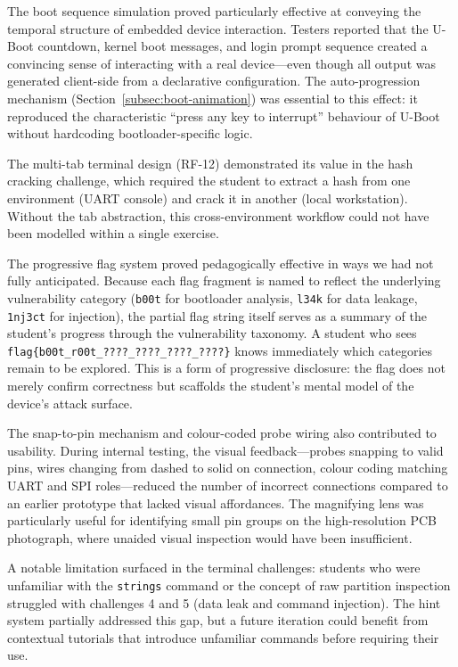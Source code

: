 The boot sequence simulation proved particularly effective at conveying the temporal structure of embedded device interaction. Testers reported that the U-Boot countdown, kernel boot messages, and login prompt sequence created a convincing sense of interacting with a real device---even though all output was generated client-side from a declarative configuration. The auto-progression mechanism (Section~\ref{subsec:boot-animation}) was essential to this effect: it reproduced the characteristic ``press any key to interrupt'' behaviour of U-Boot without hardcoding bootloader-specific logic.

The multi-tab terminal design (RF-12) demonstrated its value in the hash cracking challenge, which required the student to extract a hash from one environment (UART console) and crack it in another (local workstation). Without the tab abstraction, this cross-environment workflow could not have been modelled within a single exercise.

The progressive flag system proved pedagogically effective in ways we had not fully anticipated. Because each flag fragment is named to reflect the underlying vulnerability category (\texttt{b00t} for bootloader analysis, \texttt{l34k} for data leakage, \texttt{1nj3ct} for injection), the partial flag string itself serves as a summary of the student's progress through the vulnerability taxonomy. A student who sees \texttt{flag\{b00t\_r00t\_????\_????\_????\_????\}} knows immediately which categories remain to be explored. This is a form of progressive disclosure: the flag does not merely confirm correctness but scaffolds the student's mental model of the device's attack surface.

The snap-to-pin mechanism and colour-coded probe wiring also contributed to usability. During internal testing, the visual feedback---probes snapping to valid pins, wires changing from dashed to solid on connection, colour coding matching UART and SPI roles---reduced the number of incorrect connections compared to an earlier prototype that lacked visual affordances. The magnifying lens was particularly useful for identifying small pin groups on the high-resolution PCB photograph, where unaided visual inspection would have been insufficient.

A notable limitation surfaced in the terminal challenges: students who were unfamiliar with the \texttt{strings} command or the concept of raw partition inspection struggled with challenges 4 and 5 (data leak and command injection). The hint system partially addressed this gap, but a future iteration could benefit from contextual tutorials that introduce unfamiliar commands before requiring their use.

